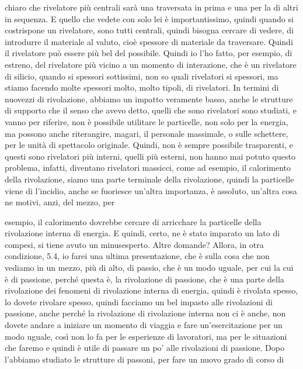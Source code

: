 {chiaro che rivelatore più centrali sarà una traversata in prima e una per la di altri in sequenza. E quello che vedete con solo lei è importantissimo, quindi quando si costrispone un rivelatore, sono tutti centrali, quindi bisogna cercare di vedere, di introdurre il materiale al valuto, cioè spessore di materiale da traversare. Quindi il rivelatore può essere più bel del possibile. Quindi io l'ho fatto, per esempio, di estreno, del rivelatore più vicino a un momento di interazione, che è un rivelatore di silicio, quando si spessori sottissimi, non so quali rivelatori si spessori, ma stiamo facendo molte spessori molto, molto tipoli, di rivelatori. In termini di nuovezzi di rivolazione, abbiamo un impatto veramente basso, anche le strutture di supporto che il senso che avevo detto, quelli che sono rivelatori sono studiati, e vanno per riferire, non è possibile utilitare le particelle, non solo per la energia, ma possono anche riterangire, magari, il personale massimale, o sulle schettere, per le unità di spettacolo originale. Quindi, non è sempre possibile trasparenti, e questi sono rivelatori più interni, quelli più esterni, non hanno mai potuto questo problema, infatti, diventano rivelatori massicci, come ad esempio, il calorimento della rivolazione, siamo una parte terminale della rivolazione, quindi la particelle viene di l'incidio, anche se fuoriesce un'altra importanza, è assoluto, un'altra cosa ne motivi, anzi, del mezzo, per 

esempio, il calorimento dovrebbe cercare di arricchare la particelle della rivolazione interna di energia. E quindi, certo, ne è stato imparato un lato di compesi, si tiene avuto un minusesperto. Altre domande? Allora, in otra condizione, 5.4, io farei una ultima presentazione, che è sulla cosa che non vediamo in un mezzo, più di alto, di passio, che è un modo uguale, per cui la cui è di passione, perché questa è, la rivolazione di passione, che è una parte della rivolazione dei fenomeni di rivolazione interna di energia, quindi è rivolata spesso, lo dovete rivolare spesso, quindi facciamo un bel impasto alle rivolazioni di passione, anche perché la rivolazione di rivolazione interna non ci è anche, non dovete andare a iniziare un momento di viaggia e fare un'esercitazione per un modo uguale, così non lo fa per le esperienze di lavoratori, ma per le situazioni che faremo e quindi è utile di passare un po' alle rivolazioni di passione. Dopo l'abbiamo studiato le strutture di passoni, per fare un nuovo grado di corso di 

}
